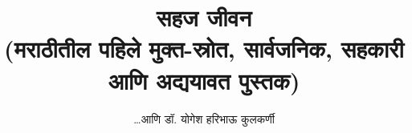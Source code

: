 
\usepackage{fontspec}
\usepackage{tikz}
\usepackage{everypage}

\setmainfont[Script=Devanagari] {Tiro Devanagari Marathi}
\newfontfamily{}
\newfontfamily{}
\graphicspath{{images/}}


\date{} %


\title{
    {\Huge \textbf{सहज जीवन}} \\ 
    \vspace{0.5em}
    {\large (मराठीतील पहिले मुक्त-स्रोत, सार्वजनिक, सहकारी आणि अद्ययावत पुस्तक)}
}
\author{\Large\textsc{\ldots आणि डॉ. योगेश हरिभाऊ कुलकर्णी}}


\frontmatter
\maketitle

%
\tableofcontents

\mainmatter



